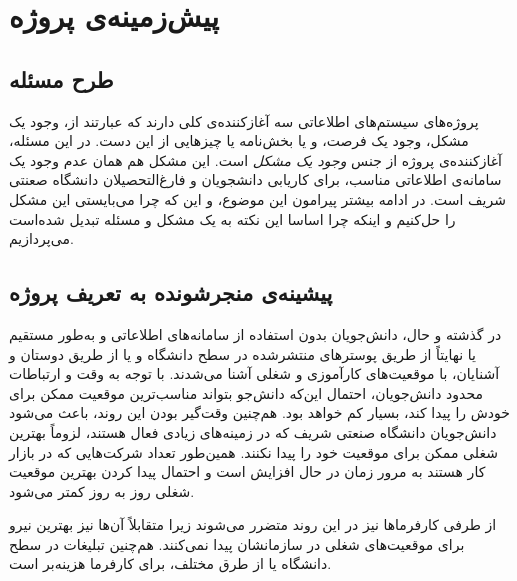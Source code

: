 


\chapter{
	پیش‌زمینه‌ی پروژه
}



\section{طرح مسئله}
پروژه‌های سیستم‌های اطلاعاتی سه آغازکننده‌ی کلی دارند که عبارتند از، وجود یک مشکل، وجود یک فرصت، و یا بخش‌نامه یا چیزهایی از این دست.
در این مسئله، آغازکننده‌ی پروژه از جنس
\emph{وجود یک مشکل}
است. این مشکل هم همان عدم وجود یک سامانه‌ی اطلاعاتی مناسب، برای کاریابی دانشجویان و فارغ‌التحصیلان دانشگاه صعنتی شریف است.
در ادامه بیشتر پیرامون این موضوع، و این که چرا می‌بایستی این مشکل را حل‌کنیم و اینکه چرا اساسا این نکته به یک مشکل و مسئله تبدیل شده‌است می‌پردازیم.


\section{پیشینه‌ی منجرشونده به تعریف پروژه}%
در گذشته و حال، دانش‌جویان بدون استفاده از سامانه‌های اطلاعاتی و به‌طور مستقیم یا نهایتاً از طریق پوسترهای منتشرشده در سطح دانشگاه و یا از طریق دوستان و آشنایان، با موقعیت‌های کارآموزی و شغلی آشنا می‌شدند. با توجه به وقت و ارتباطات محدود دانش‌جویان، احتمال این‌که دانش‌جو بتواند مناسب‌ترین موقعیت ممکن برای خودش را پیدا کند، بسیار کم خواهد بود. هم‌چنین وقت‌گیر بودن این روند، باعث می‌شود دانش‌جویان دانشگاه صنعتی شریف که در زمینه‌های زیادی فعال هستند، لزوماً بهترین شغلی ممکن برای موقعیت خود را پیدا نکنند. همین‌طور تعداد شرکت‌هایی که در بازار کار هستند به مرور زمان در حال افزایش است و احتمال پیدا کردن بهترین موقعیت شغلی روز به روز کمتر می‌شود. 

از طرفی کارفرماها نیز در این روند متضرر می‌شوند زیرا متقابلاً آن‌ها نیز بهترین نیرو برای موقعیت‌های شغلی در سازمانشان پیدا نمی‌کنند. هم‌چنین تبلیغات در سطح دانشگاه یا از طرق مختلف، برای کارفرما هزینه‌بر است. 

